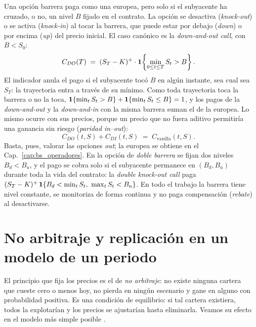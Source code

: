 Una opción barrera paga como una europea, pero solo si el subyacente ha
cruzado, o no, un nivel $B$ fijado en el contrato. La opción se
desactiva (\emph{knock-out}) o se activa (\emph{knock-in}) al tocar la
barrera, que puede estar por debajo (\emph{down}) o por encima
(\emph{up}) del precio inicial. El caso canónico es la
\emph{down-and-out call}, con $B < S_0$:
\begin{equation}\label{eq:payoff_DO_call}
  C_{DO}(T) \;=\; (S_T - K)^+ \cdot
  \mathbf{1}\!\left\{\min_{0 \leq t \leq T} S_t > B\right\}.
\end{equation}
El indicador anula el pago si el subyacente tocó $B$ en algún instante,
sea cual sea $S_T$: la trayectoria entra a través de su mínimo. Como
toda trayectoria toca la barrera o no la toca,
$\mathbf{1}\{\min_t S_t > B\} + \mathbf{1}\{\min_t S_t \leq B\} = 1$, y los pagos de
la \emph{down-and-out} y la \emph{down-and-in} con la misma barrera
suman el de la europea. Lo mismo ocurre con sus precios, porque un
precio que no fuera aditivo permitiría una ganancia sin riesgo
(\emph{paridad in--out}):
\begin{equation}\label{eq:paridad_in_out}
  C_{DO}(t, S) + C_{DI}(t, S) \;=\; C_{\text{vanilla}}(t, S).
\end{equation}
Basta, pues, valorar las opciones \emph{out}; la europea se obtiene en
el Cap.~\ref{cap:bs_operadores}\enprep. En la opción de \emph{doble barrera}
se fijan dos niveles $B_d < B_u$, y el pago se cobra solo si el
subyacente permanece en $(B_d, B_u)$ durante toda la vida del contrato:
la \emph{double knock-out call} paga
$(S_T - K)^+\, \1\{B_d < \min_t S_t,\ \max_t S_t < B_u\}$. En todo el trabajo la barrera tiene nivel constante, se monitoriza de
forma continua y no paga compensación (\emph{rebate}) al desactivarse.

\section{No arbitraje y replicación en un modelo de un periodo}\label{sec:no_arbitraje}

El principio que fija los precios es el de \emph{no arbitraje}: no
existe ninguna cartera que cueste cero o menos hoy, no pierda en ningún
escenario y gane en alguno con probabilidad positiva. Es una condición
de equilibrio: si tal cartera existiera, todos la explotarían y los
precios se ajustarían hasta eliminarla. Veamos su efecto en el modelo
más simple posible \cite[sec.~2.2]{tfgm}.

\medskip

